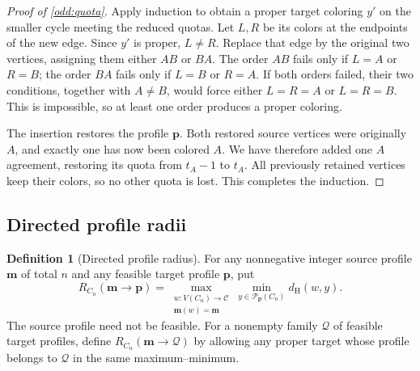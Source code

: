 \documentclass[10pt,a4paper]{amsart}
\numberwithin{equation}{section}
\theoremstyle{definition}
\newtheorem{definition}[theorem]{Definition}
\theoremstyle{remark}
\begin{document}
\begin{proof}[Proof of \cref{odd:quota}]
Apply induction to obtain a proper target coloring $y'$ on the
smaller cycle meeting the reduced quotas. Let $L,R$ be its colors at
the endpoints of the new edge. Since $y'$ is proper, $L\ne R$.
Replace that edge by the original two vertices, assigning them
either $AB$ or $BA$. The order $AB$ fails only if $L=A$ or $R=B$;
the order $BA$ fails only if $L=B$ or $R=A$.
If both orders failed, their two conditions, together with $A\ne B$,
would force either $L=R=A$ or $L=R=B$. This is impossible, so at
least one order produces a proper coloring.

The insertion restores the profile $\mathbf p$. Both restored source
vertices were originally $A$, and exactly one has now been colored
$A$. We have therefore added one $A$ agreement, restoring its quota
from $t_A-1$ to $t_A$. All previously retained vertices keep their
colors, so no other quota is lost. This completes the induction.
\end{proof}


\subsection{Directed profile radii}

\begin{definition}[Directed profile radius]\label{odd:directed-definition}
For any nonnegative integer source profile $\mathbf m$ of total $n$
and any feasible target profile $\mathbf p$, put
\[
 R_{C_n}(\mathbf m\to\mathbf p)
 =\max_{\substack{w:V(C_n)\to\mathcal C\\\mathbf m(w)=\mathbf m}}
   \min_{y\in\mathcal P_{\mathbf p}(C_n)}d_{\mathrm H}(w,y).
\]
The source profile need not be feasible.
For a nonempty family $\mathcal Q$ of feasible target profiles, define
$R_{C_n}(\mathbf m\to\mathcal Q)$ by allowing any proper target whose
profile belongs to $\mathcal Q$ in the same maximum--minimum.
\end{definition}
\end{document}
